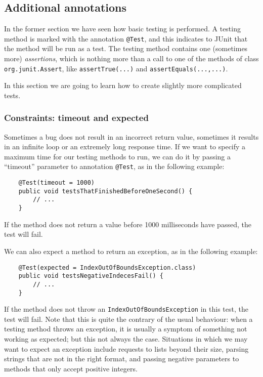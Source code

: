 \subsection{Additional annotations}
\label{sec:addit-annot}

In the former section we have seen how basic testing is performed. A
testing method is marked with the annotation \verb+@Test+, and this
indicates to JUnit that the method will be run as a test. The testing
method contains one (sometimes more) \emph{assertions}, which is
nothing more than a call to one of the methods of class
\verb+org.junit.Assert+, like \verb+assertTrue(...)+ 
and \verb+assertEquals(...,...)+. 

In this section we are going to learn how to create slightly more
complicated tests. 

\subsubsection*{Constraints: timeout and expected}
\label{sec:timeout}

Sometimes a bug does not result in an incorrect return value,
sometimes it results in an infinite loop or an extremely long response
time. If we want to specify a maximum time for our testing methods to
run, we can do it by passing a ``timeout'' parameter to annotation
\verb+@Test+, as in the following example: 

\begin{verbatim}
    @Test(timeout = 1000)  
    public void testsThatFinishedBeforeOneSecond() {  
        // ...
    }  
\end{verbatim}

If the method does not return a value before 1000 milliseconds have
passed, the test will fail. 

We can also expect a method to return an exception, as in the
following example: 

\begin{verbatim}
    @Test(expected = IndexOutOfBoundsException.class)
    public void testsNegativeIndecesFail() {  
        // ...
    }  
\end{verbatim}

If the method does not throw an \verb+IndexOutOfBoundsException+ in
this test, the test will fail. Note that this is quite the contrary of
the usual behaviour: when a testing method throws an exception, it is
usually a symptom of something not working as expected; but this not
always the case. Situations in which we may want to expect an exception
include requests to lists beyond their size, parsing strings that
are not in the right format, and passing negative parameters to
methods that only accept positive integers. 

